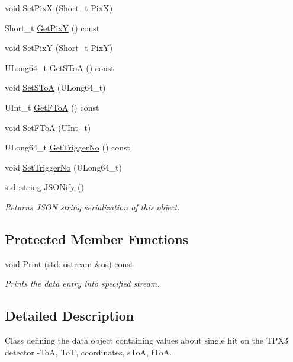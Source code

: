 \begin{DoxyCompactItemize}
void \hyperlink{classSingleTPX3Hit_acca41f239bb79f26b6a839ed0f457d21}{Set\+Pix\+X} (Short\+\_\+t Pix\+X)
\item 
Short\+\_\+t \hyperlink{classSingleTPX3Hit_aaddc9a6cfcd0f437c9cb9ae2d6dca18c}{Get\+Pix\+Y} () const 
\item 
void \hyperlink{classSingleTPX3Hit_a90d04b97e65286c05c1dd73e3bef6922}{Set\+Pix\+Y} (Short\+\_\+t Pix\+Y)
\item 
U\+Long64\+\_\+t \hyperlink{classSingleTPX3Hit_afc43df80b407576b0a4db61b4ba18555}{Get\+S\+To\+A} () const 
\item 
void \hyperlink{classSingleTPX3Hit_afe3d992f18e307fb58e024ffd030b5f7}{Set\+S\+To\+A} (U\+Long64\+\_\+t)
\item 
U\+Int\+\_\+t \hyperlink{classSingleTPX3Hit_afafbe70e8b591a6e1d9909cfb3ac6d35}{Get\+F\+To\+A} () const 
\item 
void \hyperlink{classSingleTPX3Hit_a1118e86c81f6b9fd7bfd434c8094ce63}{Set\+F\+To\+A} (U\+Int\+\_\+t)
\item 
U\+Long64\+\_\+t \hyperlink{classSingleTPX3Hit_a8b110f24655134478dadf2e059cf32bb}{Get\+Trigger\+No} () const 
\item 
void \hyperlink{classSingleTPX3Hit_a6ad032eb1c98a2dfab6bef205bbe7311}{Set\+Trigger\+No} (U\+Long64\+\_\+t)
\item 
std\+::string \hyperlink{classSingleDataEntry_a9e48725016d6fbd6bd674d5b299dbb12}{J\+S\+O\+Nify} ()
\begin{DoxyCompactList}\small\item\em Returns J\+S\+O\+N string serialization of this object. \end{DoxyCompactList}\end{DoxyCompactItemize}
\subsection*{Protected Member Functions}
\begin{DoxyCompactItemize}
\item 
void \hyperlink{classSingleTPX3Hit_a552a56d164a8c0c02d06e56c1a367355}{Print} (std\+::ostream \&os) const 
\begin{DoxyCompactList}\small\item\em Prints the data entry into specified stream. \end{DoxyCompactList}\end{DoxyCompactItemize}


\subsection{Detailed Description}
Class defining the data object containing values about single hit on the T\+P\+X3 detector -\/\+To\+A, To\+T, coordinates, s\+To\+A, f\+To\+A. 

